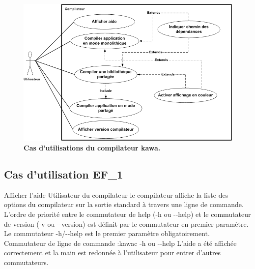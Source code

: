 \begin{figure}
  \centering
  \includegraphics[scale=0.8]{../res/stb/UseCase_F.jpg}
  \caption{\textbf{Cas d'utilisations du compilateur kawa.}}
\end{figure}

\subsection{Cas d'utilisation EF\_1}
\fiche
{Afficher l'aide}                    %
{Utilisateur du compilateur}                               %
{                                                %
  le compilateur affiche 
   la liste des options du compilateur sur la sortie standard à travers une ligne de commande.
}
{
  L'ordre de priorité entre le commutateur de help (-h ou -\hspace{0.1mm}-help) et le commutateur de version (-v ou -\hspace{0.1mm}-version) est définit par le commutateur en premier paramètre. Le commutateur -h/-\hspace{0.1mm}-help est le premier paramètre obligatoirement.
}                                                %
{Commutateur de ligne de commande :kawac -h ou -\hspace{0.1mm}-help }                             %
{L'aide a été affichée correctement et la main est redonnée à l'utilisateur pour entrer d'autres commutateurs.}                       %
{} %
{} %
{} %

